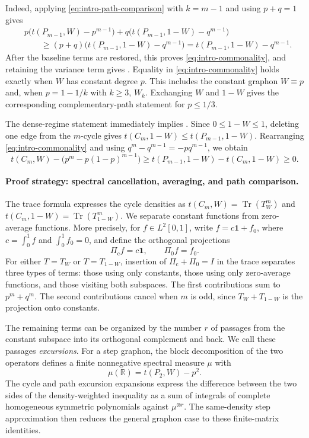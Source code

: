 \documentclass[11pt]{article}
\numberwithin{equation}{section}
\newcommand{\one}{\mathbf 1}
\newcommand{\R}{\mathbb R}
\newcommand{\Tr}{\operatorname{Tr}}
\newcommand{\tC}[2]{t(C_{#1},#2)}
\newcommand{\tP}[2]{t(P_{#1},#2)}
\newcommand{\goodman}[2]{#1^{#2}-#1(1-#1)^{#2-1}}
\newcommand{\goal}{\goodman{p}{m}}
\newcommand{\Tker}[1]{T_{#1}}
\begin{document}
Indeed, applying \eqref{eq:intro-path-comparison} with $k=m-1$
and using $p+q=1$ gives
\begin{align*}
  &p\bigl(\tP{m-1}W-p^{m-1}\bigr)
    +q\bigl(\tP{m-1}{1-W}-q^{m-1}\bigr)\\
  &\qquad\ge
    (p+q)\bigl(\tP{m-1}{1-W}-q^{m-1}\bigr)
    =\tP{m-1}{1-W}-q^{m-1}.
\end{align*}
After the baseline terms are restored, this proves
\eqref{eq:intro-commonality}, and retaining the variance term gives
. Equality in
\eqref{eq:intro-commonality} holds exactly when $W$ has constant
degree $p$. This includes the constant graphon $W\equiv p$ and,
when $p=1-1/k$ with $k\ge3$, $W_k$. Exchanging $W$ and $1-W$
gives the corresponding complementary-path statement for $p\le1/3$.

The dense-regime statement immediately implies .
Since $0\le1-W\le1$, deleting one edge from the $m$-cycle gives
$\tC m{1-W}\le\tP{m-1}{1-W}$. Rearranging
\eqref{eq:intro-commonality} and using
$q^m-q^{m-1}=-pq^{m-1}$, we obtain
\[
  \tC mW-\bigl(\goal\bigr)
  \ge\tP{m-1}{1-W}-\tC m{1-W}\ge0.
\]

\paragraph{Proof strategy: spectral cancellation, averaging, and path comparison.}
The trace formula expresses the cycle densities as
$\tC mW=\Tr(\Tker W^m)$ and
$\tC m{1-W}=\Tr(\Tker{1-W}^m)$. We separate constant functions
from zero-average functions. More precisely, for $f\in L^2[0,1]$,
write $f=c\one+f_0$, where $c=\int_0^1f$ and $\int_0^1f_0=0$,
and define the orthogonal projections
\[
  \Pi_{\mathrm c}f=c\one,
  \qquad \Pi_0f=f_0.
\]
For either $T=\Tker W$ or $T=\Tker{1-W}$, insertion of
$\Pi_{\mathrm c}+\Pi_0=I$ in the trace separates three types of terms:
those using only constants, those using only zero-average functions,
and those visiting both subspaces. The first contributions sum to
$p^m+q^m$. The second contributions cancel when $m$ is odd, since
$\Tker W+\Tker{1-W}$ is the projection onto constants.

The remaining terms can be organized by the number $r$ of passages
from the constant subspace into its orthogonal complement and back.
We call these passages \emph{excursions}. For a step graphon, the
block decomposition of the two operators defines a finite nonnegative
spectral measure $\mu$ with
\[
  \mu(\R)=\tP2W-p^2.
\]
The cycle and path excursion expansions express the difference
between the two sides of the density-weighted inequality as a sum of
integrals of complete homogeneous symmetric polynomials against
$\mu^{\otimes r}$. The same-density step approximation then reduces
the general graphon case to these finite-matrix identities.
\end{document}
